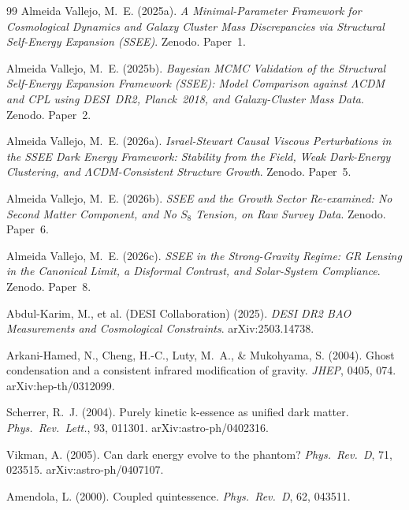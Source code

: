 \documentclass[12pt,a4paper]{article}
\begin{document}
\begin{thebibliography}{99}
  Almeida Vallejo, M.~E. (2025a).
  \textit{A Minimal-Parameter Framework for Cosmological Dynamics and Galaxy
  Cluster Mass Discrepancies via Structural Self-Energy Expansion (SSEE)}.
  Zenodo. Paper~1.

  Almeida Vallejo, M.~E. (2025b).
  \textit{Bayesian MCMC Validation of the Structural Self-Energy Expansion
  Framework (SSEE): Model Comparison against $\Lambda$CDM and CPL using DESI~DR2,
  Planck~2018, and Galaxy-Cluster Mass Data}. Zenodo. Paper~2.

  Almeida Vallejo, M.~E. (2026a).
  \textit{Israel-Stewart Causal Viscous Perturbations in the SSEE Dark Energy
  Framework: Stability from the Field, Weak Dark-Energy Clustering, and
  $\Lambda$CDM-Consistent Structure Growth}. Zenodo. Paper~5.

  Almeida Vallejo, M.~E. (2026b).
  \textit{SSEE and the Growth Sector Re-examined: No Second Matter Component,
  and No $S_8$ Tension, on Raw Survey Data}. Zenodo. Paper~6.

  Almeida Vallejo, M.~E. (2026c).
  \textit{SSEE in the Strong-Gravity Regime: GR Lensing in the Canonical
  Limit, a Disformal Contrast, and Solar-System Compliance}. Zenodo. Paper~8.

  Abdul-Karim, M., et al. (DESI Collaboration) (2025).
  \textit{DESI DR2 BAO Measurements and Cosmological Constraints}.
  arXiv:2503.14738.

  Arkani-Hamed, N., Cheng, H.-C., Luty, M.~A., \& Mukohyama, S. (2004).
  Ghost condensation and a consistent infrared modification of gravity.
  \textit{JHEP}, 0405, 074.
  arXiv:hep-th/0312099.

  Scherrer, R.~J. (2004).
  Purely kinetic k-essence as unified dark matter.
  \textit{Phys.\ Rev.\ Lett.}, 93, 011301.
  arXiv:astro-ph/0402316.

  Vikman, A. (2005).
  Can dark energy evolve to the phantom?
  \textit{Phys.\ Rev.\ D}, 71, 023515.
  arXiv:astro-ph/0407107.

  Amendola, L. (2000).
  Coupled quintessence.
  \textit{Phys.\ Rev.\ D}, 62, 043511.


\end{thebibliography}
\end{document}
